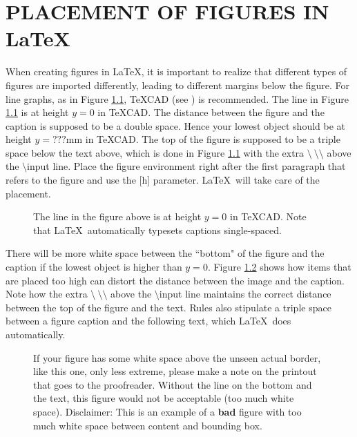 \chapter{PLACEMENT OF FIGURES IN \LaTeX }\label{chap2:body1}


When creating figures in \LaTeX, it is important to realize that
different types of figures are imported differently, leading to
different margins below the figure.
For line graphs, as in Figure \ref{pg1},
\TeX CAD (see \cite{texcad}) is recommended.
The line in Figure \ref{pg1} is at height $y=0$ in \TeX CAD.
The distance between the figure and the caption is supposed to be
a double space.
Hence your lowest object should be at height $y=???$mm
in \TeX CAD.
The top of the figure is supposed to be a triple space below the
text above, which is done in Figure \ref{pg1}
with the extra $\setminus ~\setminus \setminus $ above the
$\setminus $input line.
Place the figure environment right after the first paragraph that
refers to the figure and use the [h] parameter.
\LaTeX \ will take care of the placement.


\begin{figure}[h]
\centerline{}
\caption{
The line
in the figure above is at height $y=0$ in \TeX CAD.
Note that \LaTeX \ automatically typesets captions single-spaced.
}
\label{pg1}

\end{figure}


There will be more white space between the ``bottom" of the figure and
the caption if the lowest object is higher than $y=0$.
Figure \ref{pg3} shows how items that are placed too high can
distort the distance between the image and the caption.
Note how the extra $\setminus ~\setminus \setminus $ above the
$\setminus $input line maintains the correct distance between
the top of the figure and the text.
Rules also stipulate a triple space between a figure caption and the
following text, which \LaTeX \ does automatically.



\begin{figure}[h]
\centering

\caption{If your figure has some white space above the unseen actual border,
like this one, only less extreme, please make a note on the printout that
goes to the proofreader. Without the line on the bottom and the text,
this figure would not be acceptable (too much white space).
Disclaimer: This is an example of a {\bf bad} figure with too much
white space between content and bounding box.}
\label{pg3}

\end{figure}



